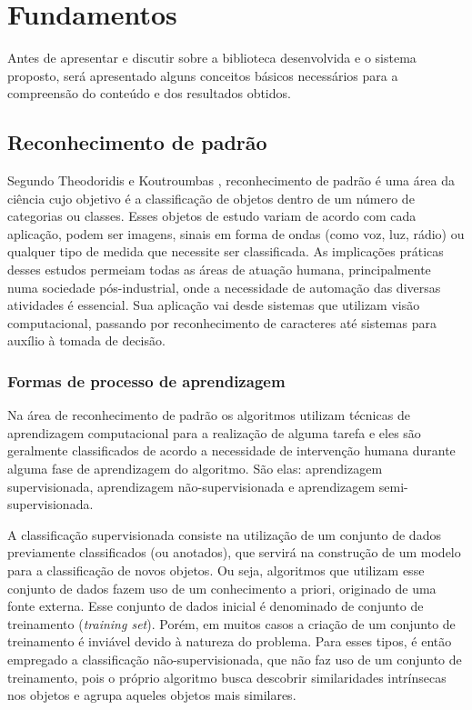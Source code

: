 \documentclass[a4paper,12pt]{article}
\begin{document}
\newpage
\section {Fundamentos}
\label {sec:fundamentos}
Antes de apresentar e discutir sobre a biblioteca desenvolvida e o sistema proposto, será apresentado alguns conceitos básicos necessários para a compreensão do conteúdo e dos resultados obtidos.

\subsection{Reconhecimento de padrão}
\label{sec:reconhecimento_padrao}

Segundo Theodoridis e Koutroumbas  \cite{Koutroumbas06}, reconhecimento de padrão é uma área da ciência cujo objetivo é a classificação de objetos dentro de um número de categorias ou classes. Esses objetos de estudo variam de acordo com cada aplicação, podem ser imagens, sinais em forma de ondas (como voz, luz, rádio) ou qualquer tipo de medida que necessite ser classificada. As implicações práticas desses estudos permeiam todas as áreas de atuação humana, principalmente numa sociedade pós-industrial, onde a necessidade de automação das diversas atividades é essencial.  Sua aplicação vai desde sistemas que utilizam visão computacional, passando por reconhecimento de caracteres até sistemas para auxílio à tomada de decisão.

\subsubsection{Formas de processo de aprendizagem}
\label{sec:formas_processo_aprendizagem}

Na área de reconhecimento de padrão os algoritmos utilizam técnicas de aprendizagem computacional para a realização de alguma tarefa e eles são geralmente classificados de acordo a necessidade de intervenção humana durante alguma fase de aprendizagem do algoritmo. São elas: aprendizagem supervisionada,  aprendizagem não-supervisionada e aprendizagem semi-supervisionada.

A classificação supervisionada consiste na utilização de um conjunto de dados previamente classificados (ou anotados), que servirá na construção de um modelo para a classificação de novos objetos. Ou seja, algoritmos que utilizam esse conjunto de dados fazem uso de um conhecimento a priori, originado de uma fonte externa. Esse conjunto de dados inicial é denominado de conjunto de treinamento (\textit{training set}). Porém, em muitos casos a criação de um conjunto de treinamento é inviável devido à natureza do problema. Para esses tipos, é então empregado a classificação não-supervisionada, que não faz uso de um conjunto de treinamento, pois o próprio algoritmo busca descobrir similaridades intrínsecas nos objetos e agrupa aqueles objetos mais similares. \cite{Koutroumbas06, Jain99, Manning09}
\end{document}
